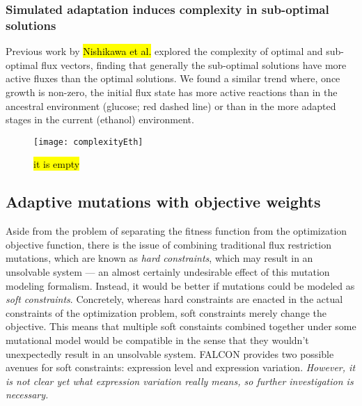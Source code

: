 \subsubsection{Simulated adaptation induces complexity in sub-optimal solutions}

Previous work by \hl{Nishikawa et al.} explored the complexity of optimal
and sub-optimal flux vectors, finding that generally the sub-optimal
solutions have more active fluxes than the optimal solutions. We found
a similar trend where, once growth is non-zero, the initial flux state
has more active reactions than in the ancestral environment (glucose;
red dashed line) or than in the more adapted stages in the current
(ethanol) environment.


\begin{figure}
\centering
  \texttt{[image: complexityEth]}
  \caption{\hl{it is empty}} 
  \label{fig:complexityEth}
\end{figure}


\subsection{Adaptive mutations with objective weights}

Aside from the problem of separating the fitness function from the 
optimization objective function, there is the issue of combining traditional flux
restriction mutations, which are known as \emph{hard constraints}, which may
result in an unsolvable system --- an almost certainly undesirable
effect of this mutation modeling formalism. Instead, it would be
better if mutations could be modeled as \emph{soft
  constraints}. Concretely, whereas hard constraints are enacted in
the actual constraints of the optimization problem, soft constraints
merely change the objective. This means that multiple soft constaints
combined together under some mutational model would be compatible in
the sense that they wouldn't unexpectedly result in an unsolvable
system. FALCON provides two possible avenues for soft constraints:
expression level and expression variation. \emph{However, it is not
  clear yet what expression variation really means, so further
  investigation is necessary.}


